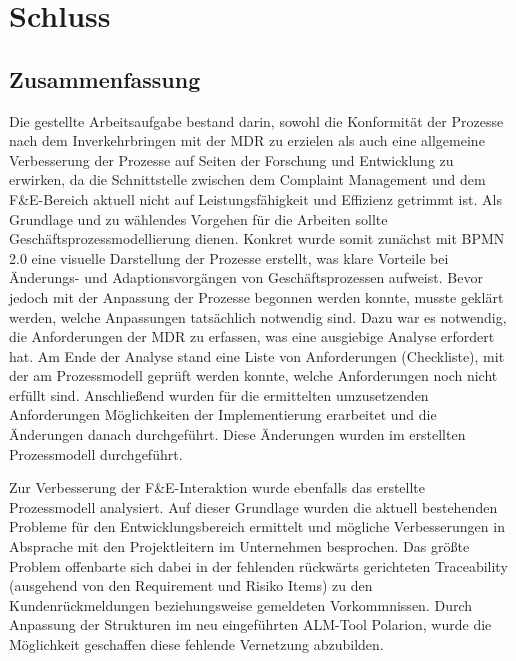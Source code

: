\documentclass[a4paper,12pt]{report}
\begin{document}
\chapter{Schluss}
\section{Zusammenfassung}\label{sec:Zusammenfassung}
Die gestellte Arbeitsaufgabe bestand darin, sowohl die Konformität der Prozesse nach dem Inverkehrbringen mit der MDR zu erzielen als auch eine allgemeine Verbesserung der Prozesse auf Seiten der Forschung und Entwicklung zu erwirken, da die Schnittstelle zwischen dem Complaint Management und dem F\&E-Bereich aktuell nicht auf Leistungsfähigkeit und Effizienz getrimmt ist. Als Grundlage und zu wählendes Vorgehen für die Arbeiten sollte Geschäftsprozessmodellierung dienen. Konkret wurde somit zunächst mit BPMN 2.0 eine visuelle Darstellung der Prozesse erstellt, was klare Vorteile bei Änderungs- und Adaptionsvorgängen von Geschäftsprozessen aufweist. Bevor jedoch mit der Anpassung der Prozesse begonnen werden konnte, musste geklärt werden, welche Anpassungen tatsächlich notwendig sind. Dazu war es notwendig, die Anforderungen der MDR zu erfassen, was eine ausgiebige Analyse erfordert hat. Am Ende der Analyse stand eine Liste von Anforderungen (Checkliste), mit der am Prozessmodell geprüft werden konnte, welche Anforderungen noch nicht erfüllt sind. Anschließend wurden für die ermittelten umzusetzenden Anforderungen Möglichkeiten der Implementierung erarbeitet und die Änderungen danach durchgeführt. Diese Änderungen wurden im erstellten Prozessmodell durchgeführt.

Zur Verbesserung der F\&E-Interaktion wurde ebenfalls das erstellte Prozessmodell analysiert. Auf dieser Grundlage wurden die aktuell bestehenden Probleme für den Entwicklungsbereich ermittelt und mögliche Verbesserungen in Absprache mit den Projektleitern im Unternehmen besprochen. Das größte Problem offenbarte sich dabei in der fehlenden rückwärts gerichteten Traceability (ausgehend von den Requirement und Risiko Items) zu den Kundenrückmeldungen beziehungsweise gemeldeten Vorkommnissen. Durch Anpassung der Strukturen im neu eingeführten ALM-Tool Polarion, wurde die Möglichkeit geschaffen diese fehlende Vernetzung abzubilden.
\end{document}
